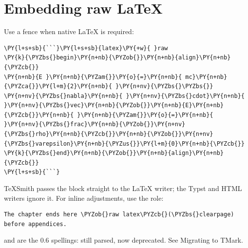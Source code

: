 \documentclass[a4paper,twoside]{article}
\begin{document}
\section{Embedding raw \LaTeX{}}
Use a  fence when native \LaTeX{} is required:
\begin{tscode}[lang=md, engine=pygments]
\begin{Verbatim}[commandchars=\\\{\},breaklines, breakanywhere, commandchars=\\\{\}]
\PY{l+s+sb}{```}\PY{l+s+sb}{latex}\PY{+w}{ }raw
\PY{k}{\PYZbs{}begin}\PY{n+nb}{\PYZob{}}\PY{n+nb}{align}\PY{n+nb}{\PYZcb{}}
\PY{n+nb}{E }\PY{n+nb}{\PYZam{}}\PY{o}{=}\PY{n+nb}{ mc}\PY{n+nb}{\PYZca{}}\PY{l+m}{2}\PY{n+nb}{ }\PY{n+nv}{\PYZbs{}\PYZbs{}}
\PY{n+nv}{\PYZbs{}nabla}\PY{n+nb}{ }\PY{n+nv}{\PYZbs{}cdot}\PY{n+nb}{ }\PY{n+nv}{\PYZbs{}vec}\PY{n+nb}{\PYZob{}}\PY{n+nb}{E}\PY{n+nb}{\PYZcb{}}\PY{n+nb}{ }\PY{n+nb}{\PYZam{}}\PY{o}{=}\PY{n+nb}{ }\PY{n+nv}{\PYZbs{}frac}\PY{n+nb}{\PYZob{}}\PY{n+nv}{\PYZbs{}rho}\PY{n+nb}{\PYZcb{}}\PY{n+nb}{\PYZob{}}\PY{n+nv}{\PYZbs{}varepsilon}\PY{n+nb}{\PYZus{}}\PY{l+m}{0}\PY{n+nb}{\PYZcb{}}
\PY{k}{\PYZbs{}end}\PY{n+nb}{\PYZob{}}\PY{n+nb}{align}\PY{n+nb}{\PYZcb{}}
\PY{l+s+sb}{```}
\end{Verbatim}
\end{tscode}
TeXSmith passes the block straight to the \LaTeX{} writer; the Typst and HTML
writers ignore it. For inline adjustments, use the  role:
\begin{tscode}[lang=md, engine=pygments]
\begin{Verbatim}[commandchars=\\\{\},breaklines, breakanywhere, commandchars=\\\{\}]
The chapter ends here \PYZob{}raw latex\PYZcb{}(\PYZbs{}clearpage) before appendices.
\end{Verbatim}
\end{tscode}
 and  are the 0.6 spellings: still parsed, now
deprecated. See Migrating to TMark.
\end{document}
